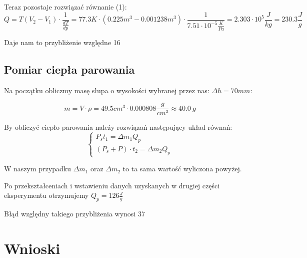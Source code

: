 \documentclass{article}
\begin{document}
Teraz pozostaje rozwiązać równanie (1):
\begin{equation}
	Q = T(V_2-V_1) \cdot \frac{1}{\frac{dT}{dp}} = 77.3K \cdot (0.225 m^3 - 0.001238 m^3) \cdot \frac{1}{7.51 \cdot 10^{-5} \frac{K}{Pa}} = 2.303 \cdot 10^{5} \frac{J}{kg} = 230.3 \frac{J}{g}
\end{equation}

Daje nam to przybliżenie względne 16%

\subsection{Pomiar ciepła parowania}
Na początku obliczmy masę słupa o wysokości wybranej przez nas: $\Delta h = 70 mm$:

\begin{equation}
	m = V \cdot \rho = 49.5 cm^3 \cdot 0.000808 \frac{g}{cm^3} \approx 40.0 \:g
\end{equation}

By obliczyć ciepło parowania należy rozwiązań następujący układ równań:
\begin{equation}
	\begin{cases}
	P_s t_1 = \Delta m_1 Q_p \\
	(P_s + P) \cdot t_2 = \Delta m_2 Q_p
	\end{cases}
\end{equation}

W naszym przypadku $\Delta m_1$ oraz $\Delta m_2$ to ta sama wartość wyliczona powyżej.

Po przekształceniach i wstawieniu danych uzyskanych w drugiej części eksperymentu otrzymujemy $Q_p = 126 \frac{J}{g}$

Błąd względny takiego przybliżenia wynosi 37%
\section{Wnioski}






\end{document}
